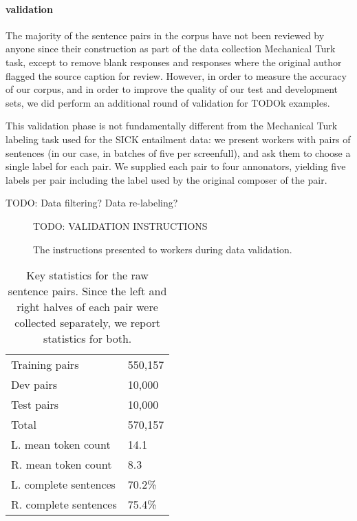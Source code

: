 \paragraph{validation}

The majority of the sentence pairs in the corpus have not been reviewed by anyone since their construction as part of the data collection Mechanical Turk task, except to remove blank responses and responses where the original author flagged the source caption for review. However, in order to measure the accuracy of our corpus, and in order to improve the quality of our test and development sets, we did perform an additional round of validation for TODOk examples.

This validation phase is not fundamentally different from the Mechanical Turk labeling task used for the SICK entailment data: we present workers with pairs of sentences (in our case, in batches of five per screenfull), and ask them to choose a single label for each pair. We supplied each pair to four annonators, yielding five labels per pair including the label used by the original composer of the pair. 

TODO: Data filtering? Data re-labeling?

\begin{figure}
\footnotesize
TODO: VALIDATION INSTRUCTIONS

\caption{\label{instructions-2}The instructions presented to workers during data validation.}
\end{figure}

\begin{table}
\center
  \begin{tabular}{l l} 
    \toprule
Training pairs &  550,157\\
Dev pairs &  10,000\\
Test pairs &  10,000\\
Total & 570,157\\
\midrule
L. mean token count & 14.1\\
R. mean token count & 8.3 \\
\midrule
L. complete sentences & 70.2\%\\
R. complete sentences & 75.4\%\\
    \bottomrule
  \end{tabular}
\caption{\label{b-table}Key statistics for the raw sentence pairs. Since the left and right halves of each pair were collected separately, we report statistics for both.} 
\end{table}


